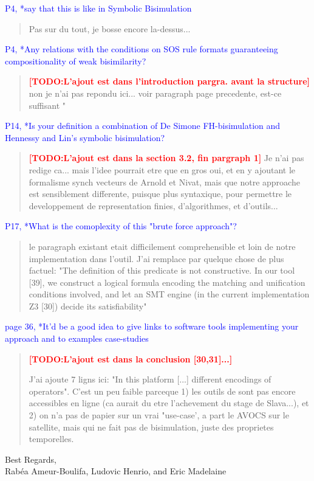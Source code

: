 \documentclass[10pt]{article}
\newcommand{\TODO}[1]{\textcolor{red}{\textbf{[TODO:#1]}}}
\newcommand{\ERIC}[1]{\textcolor{blue}{#1}}
\begin{document}
\ERIC{P4, *say that this is like in Symbolic Bisimulation}
\begin{quote}Pas sur du tout, je bosse encore la-dessus...
\end{quote}

\ERIC{P4, *Any relations with the conditions on SOS rule formats guaranteeing compositionality of weak bisimilarity?}
\begin{quote} 
\TODO{L'ajout est dans l'introduction pargra. avant la structure}
non je n'ai pas repondu ici... voir paragraph page precedente, est-ce suffisant "
\end{quote}

\ERIC{P14, *Is your definition a combination of De Simone FH-bisimulation and Hennessy and Lin's symbolic bisimulation?}
\begin{quote}
\TODO{L'ajout est dans la section 3.2, fin pargraph 1}
Je n'ai pas redige ca... mais l'idee pourrait etre que en gros oui, et en y ajoutant le formalisme synch vecteurs de Arnold et Nivat, 
mais que notre approache est sensiblement differente, puisque plus syntaxique, pour permettre le developpement de representation finies, d'algorithmes, et d'outils...
\end{quote}


\ERIC{P17, *What is the comoplexity of this "brute force approach"?}
\begin{quote}
le paragraph existant etait difficilement comprehensible et loin de notre implementation dans l'outil. J'ai remplace par quelque chose de plus factuel:
"The definition of this predicate is not constructive. In our tool [39], we construct a logical formula encoding the matching and unification conditions involved, and let an SMT engine (in the current implementation Z3 [30]) decide its satisfiability"
\end{quote}

\ERIC{page 36, *It'd be a good idea to give links to software tools implementing your approach and to examples case-studies}
\begin{quote}
\TODO{L'ajout est dans la conclusion [30,31]...}

J'ai ajoute 7 ligns ici: "In this platform [...] different encodings of operators".
C'est un peu faible parceque 1) les outils de sont pas encore accessibles en ligne (ca aurait du etre l'achevement du stage de Slava...), et 2) on n'a pas de papier sur un vrai "use-case', a part le AVOCS sur le satellite, mais qui ne fait pas de bisimulation, juste des proprietes temporelles.
\end{quote}


\begin{flushright}
  Best Regards,\\
  Rab\'ea Ameur-Boulifa, Ludovic Henrio, and Eric Madelaine
\end{flushright}
\end{document}
